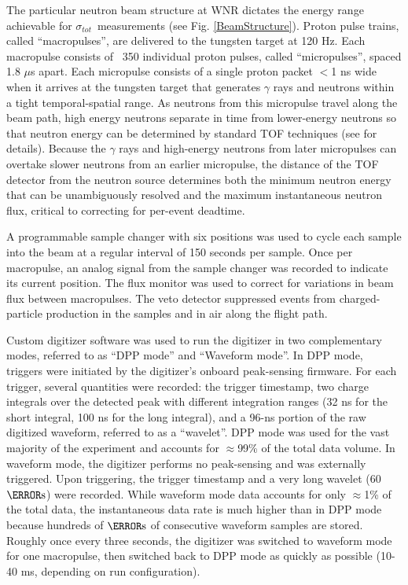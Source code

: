 \documentclass[twocolumn,secnumarabic,amssymb, nobibnotes, aps, prl,
superscriptaddress, nobalancelastpage]{revtex4}
\newcommand{\tot}{\ensuremath{\sigma_{tot}}}
\begin{document}
The particular neutron beam structure at WNR dictates the energy range
achievable for \tot\ measurements (see Fig. \ref{BeamStructure}).
Proton pulse trains, called ``macropulses'', are delivered to the tungsten target at 120 Hz.
Each macropulse consists of ~350 individual proton pulses, called
``micropulses'', spaced 1.8 
$\mu$s apart. Each micropulse consists of a single proton packet $<$1 ns wide when it 
arrives at the tungsten target that generates $\gamma$ rays and neutrons within a tight
temporal-spatial range. As neutrons from this micropulse travel along the beam path, 
high energy neutrons separate in time from lower-energy neutrons so that neutron
energy can be determined by standard TOF techniques (see \cite{Moore1980} for details).
Because the $\gamma$ rays and high-energy neutrons from later micropulses can
overtake slower neutrons from an earlier micropulse, the distance of the TOF
detector from the neutron source determines both the minimum neutron energy that can be 
unambiguously resolved and the maximum instantaneous neutron flux, critical to correcting
for per-event deadtime.

A programmable sample changer with six positions
was used to cycle each sample into the beam at a regular interval of 150 seconds 
per sample. Once per macropulse, an analog signal from the sample changer
was recorded to indicate its current position.
The flux monitor was used to correct for variations in beam flux between 
macropulses. The veto detector suppressed events from charged-particle production 
in the samples and in air along the flight path.

Custom digitizer software was used to run the 
digitizer in two complementary modes, referred to as ``DPP mode'' and ``Waveform 
mode''. In DPP mode, triggers were initiated by the digitizer's onboard
peak-sensing firmware. For each trigger, several quantities were recorded: the trigger 
timestamp, two charge integrals over the detected peak with different
integration ranges (32 ns for the short integral, 100 ns for the long integral),
and a 96-ns portion of the raw digitized waveform, referred to as a ``wavelet''.
DPP mode was used for the vast majority of the 
experiment and accounts for $\approx$99\% of the total data volume. In waveform mode, 
the digitizer performs no peak-sensing and was externally triggered. Upon 
triggering, the trigger timestamp and a very long wavelet (60 $\micro\second$) 
were recorded. While waveform mode data accounts for only $\approx$1\% of the total data, 
the instantaneous data rate is much higher than in DPP 
mode because hundreds of $\micro\second$ of consecutive waveform samples are 
stored. Roughly once every three seconds, the digitizer was switched to 
waveform mode for one macropulse, then switched back to DPP mode as quickly as
possible (10-40 ms, depending on run configuration).  
\end{document}
